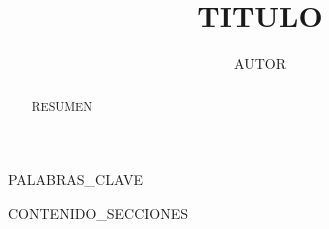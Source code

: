 \documentclass{IEEEoj}
\begin{document}

\title{{{TITULO}}}

\author{{{AUTOR}}}





\begin{abstract}
{{RESUMEN}}
\end{abstract}

\begin{IEEEkeywords}
{{PALABRAS_CLAVE}}
\end{IEEEkeywords}

%   

\maketitle

{{CONTENIDO_SECCIONES}}
\end{document}
